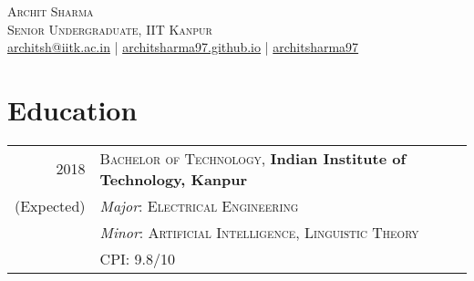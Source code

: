 \documentclass[a4paper,10pt]{article}
\begin{document}

\pagestyle{empty} %


\par{\centering
		{\hspace{-2mm}\Huge \textsc{Archit Sharma}
	}\\\large \textsc{Senior Undergraduate, IIT Kanpur}\\\normalsize \Letter\hspace{1mm}\href{mailto:architsh@iitk.ac.in}{architsh@iitk.ac.in} | \Mundus\hspace{1mm}\href{https://architsharma97.github.io/}{ architsharma97.github.io} | \faGithub \hspace{0mm} \href{https://github.com/architsharma97/}{architsharma97} \par}
	
\section{Education}
\begin{tabular}{rl}	
\textsc{2018} & \large \textsc{Bachelor of Technology}, \textbf{Indian Institute of Technology, Kanpur}\\
(Expected) & \textit{Major}: \textsc{Electrical Engineering} \\
         & \textit{Minor}: \textsc{Artificial Intelligence, Linguistic Theory}\\
         & {CPI}: \textsc{9.8/10} \\
\end{tabular}
\end{document}
